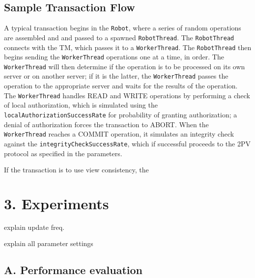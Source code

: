 \documentclass[11pt]{article}
\begin{document}
\subsection{Sample Transaction Flow}
A typical transaction begins in the \texttt{Robot}, where a series of random operations are assembled and and passed to a spawned \texttt{RobotThread}. The \texttt{RobotThread} connects with the TM, which passes it to a \texttt{WorkerThread}. The \texttt{RobotThread} then begins sending the \texttt{WorkerThread} operations one at a time, in order. The \texttt{WorkerThread} will then determine if the operation is to be processed on its own server or on another server; if it is the latter, the \texttt{WorkerThread} passes the operation to the appropriate server and waits for the results of the operation. The \texttt{WorkerThread} handles READ and WRITE operations by performing a check of local authorization, which is simulated using the \texttt{localAuthorizationSuccessRate} for probability of granting authorization; a denial of authorization forces the transaction to ABORT. When the \texttt{WorkerThread} reaches a COMMIT operation, it simulates an integrity check against the \texttt{integrityCheckSuccessRate}, which if successful proceeds to the 2PV protocol as specified in the parameters.

If the transaction is to use view consistency, the 
\section{3. Experiments}
explain update freq.

explain all parameter settings
\subsection{A. Performance evaluation}
\end{document}
